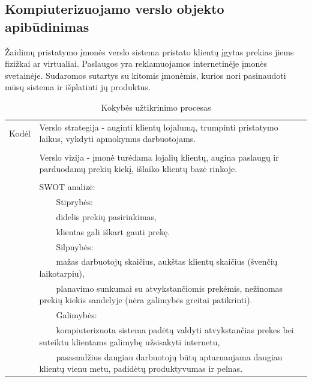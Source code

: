 \documentclass{VUMIFPSkursinis}
\newcommand{\tabitem}{~~\llap{\textbullet}~~}
\newcommand{\tabitemd}{~~\llap{\textopenbullet}~~}
\begin{document}
\subsection{Kompiuterizuojamo verslo objekto apibūdinimas}
Žaidimų pristatymo įmonės verslo sistema pristato klientų įgytas prekias jiems fizižkai ar virtualiai. Paslaugos yra reklamuojamos internetinėje įmonės svetainėje. Sudaromos sutartys su kitomis įmonėmis, kurios nori pasinaudoti mūsų sistema ir išplatinti jų produktus.
\begin{center}
\begin{table}[ht]
\centering
	\caption{Kokybės užtikrinimo procesas}
	\begin{tabular}{| p{0.1\linewidth} | p{0.9\linewidth }|} 
	\hline
	Kodėl  & Verslo strategija - auginti klientų lojalumą, trumpinti pristatymo laikus, vykdyti apmokymus darbuotojams.\\ 
		&\\
		& Verslo vizija - įmonė turėdama lojalių klientų, augina paslaugų ir parduodamų prekių kiekį, išlaiko klientų bazė rinkoje. \\
		&\\
		& SWOT analizė: \\
		&\hspace{4mm}\tabitem Stiprybės: \\ 
		&\hspace{8mm}\tabitemd didelis prekių pasirinkimas, \\
		&\hspace{8mm}\tabitemd klientas gali iškart gauti prekę. \\
		&\hspace{4mm}\tabitem Silpnybės: \\
		&\hspace{8mm}\tabitemd mažas darbuotojų skaičius, aukštas klientų skaičius (švenčių laikotarpiu), \\
		&\hspace{8mm}\tabitemd planavimo sunkumai su atvykstančiomis prekėmis, nežinomas prekių kiekis sandelyje (nėra galimybės greitai patikrinti). \\
		&\hspace{4mm}\tabitem Galimybės: \\
		&\hspace{8mm}\tabitemd kompiuterizuota sistema padėtų valdyti atvykstančias prekes bei suteiktu klientams galimybę užsisakyti internetu, \\
		&\hspace{8mm}\tabitemd pasasmdžius daugiau darbuotojų būtų aptarnaujama daugiau klientų vienu metu, padidėtų produktyvumas ir pelnas. \\

\end{tabular}
\end{table}
\end{center}
\end{document}
